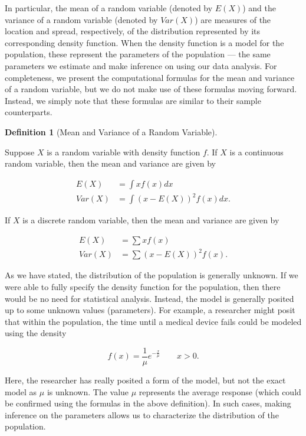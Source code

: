 \documentclass[
  letterpaper,
  DIV=11,
  numbers=noendperiod]{scrreprt}
\theoremstyle{definition}
\newtheorem{definition}{Definition}[chapter]
\theoremstyle{definition}
\theoremstyle{remark}
\begin{document}
In particular, the mean of a random variable (denoted by \(E(X)\)) and
the variance of a random variable (denoted by \(Var(X)\)) are measures
of the location and spread, respectively, of the distribution
represented by its corresponding density function. When the density
function is a model for the population, these represent the parameters
of the population --- the same parameters we estimate and make inference
on using our data analysis. For completeness, we present the
computational formulas for the mean and variance of a random variable,
but we do not make use of these formulas moving forward. Instead, we
simply note that these formulas are similar to their sample
counterparts.

\begin{definition}[Mean and Variance of a Random
Variable]\protect\hypertarget{def-rv-mean-variance}{}\label{def-rv-mean-variance}

Suppose \(X\) is a random variable with density function \(f\). If \(X\)
is a continuous random variable, then the mean and variance are given by

\[
\begin{aligned}
  E(X) &= \int x f(x) dx \\
  Var(X) &= \int \left(x - E(X)\right)^2 f(x) dx.
\end{aligned}
\]

If \(X\) is a discrete random variable, then the mean and variance are
given by

\[
\begin{aligned}
  E(X) &= \sum x f(x) \\
  Var(X) &= \sum \left(x - E(X)\right)^2 f(x).
\end{aligned}
\]

\end{definition}

As we have stated, the distribution of the population is generally
unknown. If we were able to fully specify the density function for the
population, then there would be no need for statistical analysis.
Instead, the model is generally posited up to some unknown values
(parameters). For example, a researcher might posit that within the
population, the time until a medical device fails could be modeled using
the density

\[f(x) = \frac{1}{\mu} e^{-\frac{x}{\mu}} \qquad x > 0.\]

Here, the researcher has really posited a form of the model, but not the
exact model as \(\mu\) is unknown. The value \(\mu\) represents the
average response (which could be confirmed using the formulas in the
above definition). In such cases, making inference on the parameters
allows us to characterize the distribution of the population.
\end{document}
